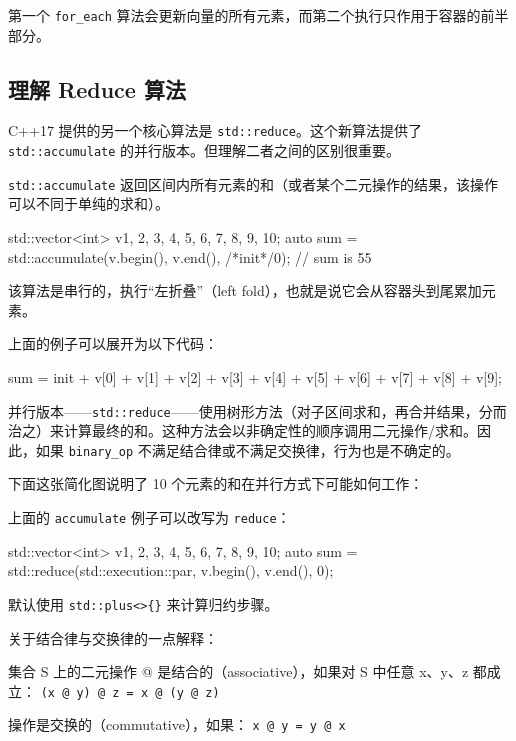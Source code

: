 第一个 \texttt{for\_each} 算法会更新向量的所有元素，而第二个执行只作用于容器的前半部分。


\subsection{理解 Reduce 算法}

C++17 提供的另一个核心算法是 \texttt{std::reduce}。这个新算法提供了 \texttt{std::accumulate} 的并行版本。但理解二者之间的区别很重要。

\texttt{std::accumulate} 返回区间内所有元素的和（或者某个二元操作的结果，该操作可以不同于单纯的求和）。

\begin{codebox}[cpp]
std::vector<int> v{1, 2, 3, 4, 5, 6, 7, 8, 9, 10};
auto sum = std::accumulate(v.begin(), v.end(), /*init*/0);
// sum is 55
\end{codebox}

该算法是串行的，执行“左折叠”（left fold），也就是说它会从容器头到尾累加元素。

上面的例子可以展开为以下代码：

\begin{codebox}[text]
sum = init +
v[0] + v[1] + v[2] +
v[3] + v[4] + v[5] +
v[6] + v[7] + v[8] + v[9];
\end{codebox}

并行版本——\texttt{std::reduce}——使用树形方法（对子区间求和，再合并结果，分而治之）来计算最终的和。这种方法会以非确定性的顺序调用二元操作/求和。因此，如果 \texttt{binary\_op} 不满足结合律或不满足交换律，行为也是不确定的。

下面这张简化图说明了 10 个元素的和在并行方式下可能如何工作：


上面的 \texttt{accumulate} 例子可以改写为 \texttt{reduce}：

\begin{codebox}[cpp]
std::vector<int> v{1, 2, 3, 4, 5, 6, 7, 8, 9, 10};
auto sum = std::reduce(std::execution::par, v.begin(), v.end(), 0);
\end{codebox}

默认使用 \texttt{std::plus<>\{\}} 来计算归约步骤。

关于结合律与交换律的一点解释：

集合 S 上的二元操作 @ 是结合的（associative），如果对 S 中任意 x、y、z 都成立：
\texttt{(x @ y) @ z = x @ (y @ z)}

操作是交换的（commutative），如果：
\texttt{x @ y = y @ x}


